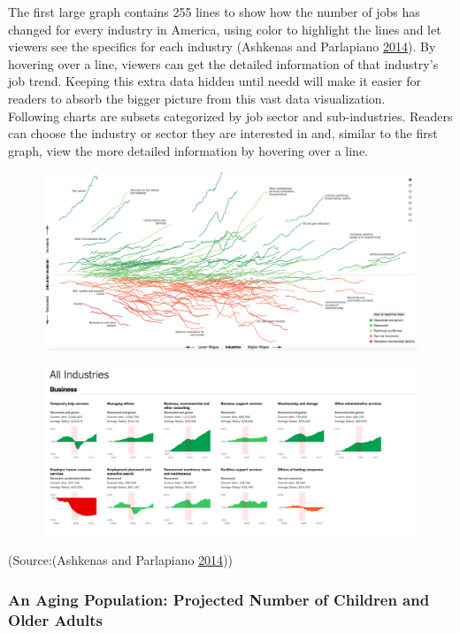 \documentclass[]{book}
\theoremstyle{definition}
\theoremstyle{definition}
\theoremstyle{definition}
\theoremstyle{remark}
\begin{document}
The first large graph contains 255 lines to show how the number of jobs
has changed for every industry in America, using color to highlight the
lines and let viewers see the specifics for each industry (Ashkenas and
Parlapiano \protect\hyperlink{ref-recession_economy}{2014}). By hovering
over a line, viewers can get the detailed information of that industry's
job trend. Keeping this extra data hidden until needd will make it
easier for readers to absorb the bigger picture from this vast data
visualization.\\
Following charts are subsets categorized by job sector and
sub-industries. Readers can choose the industry or sector they are
interested in and, similar to the first graph, view the more detailed
information by hovering over a line.

\begin{figure}
\centering
\includegraphics{images/recession_jobs.png}
\caption{}
\end{figure}

\begin{figure}
\centering
\includegraphics{images/recession_jobs2.png}
\caption{}
\end{figure}

(Source:(Ashkenas and Parlapiano
\protect\hyperlink{ref-recession_economy}{2014}))

\subsubsection{An Aging Population: Projected Number of Children and
Older
Adults}\label{an-aging-population-projected-number-of-children-and-older-adults}
\end{document}
